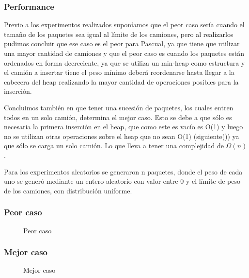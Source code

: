 \documentclass[a4paper, 10pt, twoside]{article}
\newcommand{\tresgraficos}[3]{
    \newcommand{\separacion}{-2.2em}
    \vspace{\separacion}
    
    \vspace{\separacion}
    
    \vspace{\separacion}
    
}
\begin{document}
\subsubsection{Performance}

Previo a los experimentos realizados suponíamos que el peor caso sería cuando el tamaño de los paquetes sea igual al límite de los camiones, pero al realizarlos pudimos concluir que ese caso es el peor para Pascual, ya que tiene que utilizar una mayor cantidad de camiones y que el peor caso es cuando los paquetes están ordenados en forma decreciente, ya que se utiliza un min-heap como estructura y el camión a insertar tiene el peso mínimo
deberá reordenarse hasta llegar a la cabecera del heap realizando la mayor cantidad de operaciones posibles para la inserción.

Concluimos también en que tener una sucesión de paquetes, los cuales entren todos en un solo camión, determina el mejor caso. Esto se debe a que sólo es necesaria la primera inserción en el heap, que como este es vacío es O(1) y luego no se utilizan otras operaciones sobre el heap que no sean O(1) (siguiente()) ya que sólo se carga un solo camión. Lo que lleva a tener una complejidad de $\Omega(n)$.

Para los experimentos aleatorios se generaron n paquetes, donde el peso de cada uno se generó mediante un entero aleatorio con valor entre 0 y el límite de peso de los camiones, con distribución uniforme. 

\subsubsection{Peor caso}

\begin{figure}[H]
  \centering
  \tresgraficos{problema1-peor-caso}
               {problema1-peor-caso-logn}
               {problema1-peor-caso-n}               
  \caption{Peor caso}
\end{figure}


\subsubsection{Mejor caso}

\begin{figure}[H]
  \centering
  \tresgraficos{problema1-mejor-caso}
               {problema1-mejor-caso-logn}
               {problema1-mejor-caso-n}
  \caption{Mejor caso}
\end{figure}
\end{document}
